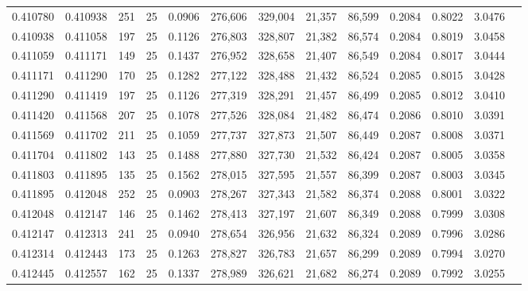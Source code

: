 \begin{tabular}{rrrrrrrrrrrrr}
0.410780 & 0.410938 &   251 &  25 &                                     0.0906 & 276,606 & 329,004 &  21,357 &  86,599 & 0.2084 & 0.8022 & 3.0476 \\
0.410938 & 0.411058 &   197 &  25 &                                     0.1126 & 276,803 & 328,807 &  21,382 &  86,574 & 0.2084 & 0.8019 & 3.0458 \\
0.411059 & 0.411171 &   149 &  25 &                                     0.1437 & 276,952 & 328,658 &  21,407 &  86,549 & 0.2084 & 0.8017 & 3.0444 \\
0.411171 & 0.411290 &   170 &  25 &                                     0.1282 & 277,122 & 328,488 &  21,432 &  86,524 & 0.2085 & 0.8015 & 3.0428 \\
0.411290 & 0.411419 &   197 &  25 &                                     0.1126 & 277,319 & 328,291 &  21,457 &  86,499 & 0.2085 & 0.8012 & 3.0410 \\
0.411420 & 0.411568 &   207 &  25 &                                     0.1078 & 277,526 & 328,084 &  21,482 &  86,474 & 0.2086 & 0.8010 & 3.0391 \\
0.411569 & 0.411702 &   211 &  25 &                                     0.1059 & 277,737 & 327,873 &  21,507 &  86,449 & 0.2087 & 0.8008 & 3.0371 \\
0.411704 & 0.411802 &   143 &  25 &                                     0.1488 & 277,880 & 327,730 &  21,532 &  86,424 & 0.2087 & 0.8005 & 3.0358 \\
0.411803 & 0.411895 &   135 &  25 &                                     0.1562 & 278,015 & 327,595 &  21,557 &  86,399 & 0.2087 & 0.8003 & 3.0345 \\
0.411895 & 0.412048 &   252 &  25 &                                     0.0903 & 278,267 & 327,343 &  21,582 &  86,374 & 0.2088 & 0.8001 & 3.0322 \\
0.412048 & 0.412147 &   146 &  25 &                                     0.1462 & 278,413 & 327,197 &  21,607 &  86,349 & 0.2088 & 0.7999 & 3.0308 \\
0.412147 & 0.412313 &   241 &  25 &                                     0.0940 & 278,654 & 326,956 &  21,632 &  86,324 & 0.2089 & 0.7996 & 3.0286 \\
0.412314 & 0.412443 &   173 &  25 &                                     0.1263 & 278,827 & 326,783 &  21,657 &  86,299 & 0.2089 & 0.7994 & 3.0270 \\
0.412445 & 0.412557 &   162 &  25 &                                     0.1337 & 278,989 & 326,621 &  21,682 &  86,274 & 0.2089 & 0.7992 & 3.0255 \\

\end{tabular}
